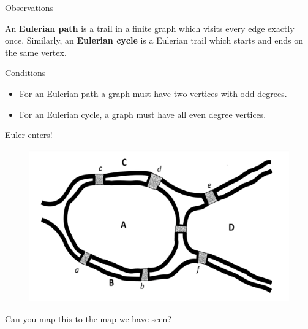 \documentclass[mathserif]{beamer}
\begin{document}
\begin{frame}{Observations}

An\textbf{ Eulerian path} is a trail in a finite graph which visits every edge exactly
once. Similarly, an \textbf{Eulerian cycle} is a Eulerian trail which starts and ends on the same vertex.
\pause
\begin{block}{Conditions}
    \begin{itemize}
        \item For an Eulerian path a graph must have two vertices with odd degrees.
        \item For an Eulerian cycle, a graph must have all even degree vertices. 
    \end{itemize}
\end{block}
\end{frame}

\begin{frame}{Euler enters!}
    \begin{figure}
        \centering
        \includegraphics[scale=.25]{euler's map.png}
    \end{figure}
    Can you map this to the map we have seen?
\end{frame}
\end{document}
